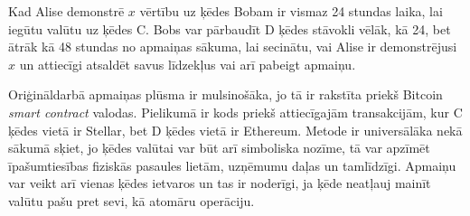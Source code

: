 Kad Alise demonstrē $x$ vērtību uz ķēdes Bobam ir vismaz 24 stundas laika, lai iegūtu valūtu uz ķēdes C.
Bobs var pārbaudīt D ķēdes stāvokli vēlāk, kā 24, bet ātrāk kā 48 stundas no apmaiņas sākuma, lai secinātu, vai Alise ir demonstrējusi $x$ un attiecīgi atsaldēt savus līdzekļus vai arī pabeigt apmaiņu.

Oriģināldarbā apmaiņas plūsma ir mulsinošāka, jo tā ir rakstīta priekš Bitcoin \textit{smart contract} valodas. Pielikumā ir kods priekš attiecīgajām transakcijām, kur C ķēdes vietā ir Stellar, bet D ķēdes vietā ir Ethereum.
Metode ir universālāka nekā sākumā sķiet, jo ķēdes valūtai var būt arī simboliska nozīme, tā var apzīmēt īpašumtiesības fiziskās pasaules lietām, uzņēmumu daļas un tamlīdzīgi.\cite{rosenfeld12}
Apmaiņu var veikt arī vienas ķēdes ietvaros un tas ir noderīgi, ja ķēde neatļauj mainīt valūtu pašu pret sevi, kā atomāru operāciju.
